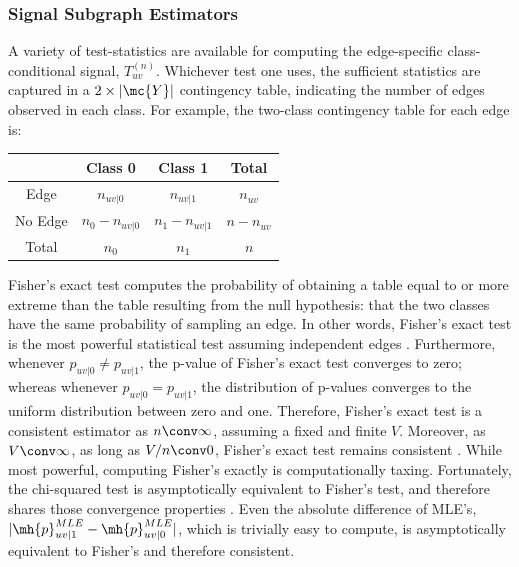 \documentclass[10pt,journal,cspaper,compsoc]{IEEEtran}
\begin{document}
\subsubsection{Signal Subgraph Estimators} %
\label{ssub:subsubsection_name5}



A variety of test-statistics are available for computing the edge-specific class-conditional signal, $T_{uv}^{(n)}$. Whichever test one uses, the sufficient statistics are captured in a $2 \times |\mc{Y}|$  contingency table, indicating the number of edges observed in each class.  For example, the two-class contingency table for each edge is:

\begin{table}[h!]
\begin{center}
\begin{tabular}{c||c|c||c}
 & Class 0  & Class 1 & Total \\
\hline\hline
Edge & $n_{uv|0}$ & $n_{uv|1}$ & $n_{uv}$ \\ \hline
No Edge & $n_0-n_{uv|0}$ & $n_1-n_{uv|1}$ & $n-n_{uv}$ \\ \hline \hline
Total & $n_0$ & $n_1$ & $n$\\
\end{tabular}
\end{center}
\label{tab:fwpath}
\end{table}%

Fisher's exact test computes the probability of obtaining a table equal to or more extreme than the table resulting from the null hypothesis: that the two classes have the same probability of sampling an edge.  In other words, Fisher's exact test is the most powerful statistical test assuming independent edges \cite{Rice1995}.  Furthermore, whenever $p_{uv|0}\neq p_{uv|1}$, the p-value of Fisher's exact test converges to zero; whereas whenever $p_{uv|0}=p_{uv|1}$, the distribution of p-values converges to the uniform distribution between zero and one.  Therefore, Fisher's exact test is a consistent estimator as $n \conv \infty$, assuming a fixed and finite $V$.  Moreover, as $V \conv \infty$, as long as $V/n \conv 0$, Fisher's exact test remains consistent \cite{Rice1995}.  While most powerful, computing Fisher's exactly is computationally taxing.  Fortunately, the chi-squared test is asymptotically equivalent to Fisher's test, and therefore shares those convergence properties \cite{Rice1995}.  Even the absolute difference of MLE's, $|\mh{p}_{uv|1}^{MLE}-\mh{p}_{uv|0}^{MLE}|$, which is trivially easy to compute, is asymptotically equivalent to Fisher's \cite{Rice1995} and therefore consistent.
\end{document}
